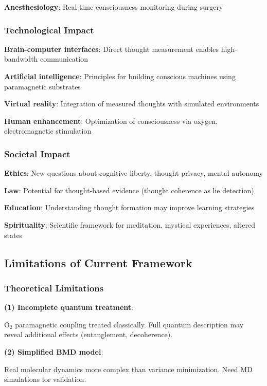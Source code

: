 \documentclass[11pt,onecolumn]{article}
\begin{document}
\textbf{Anesthesiology}: Real-time consciousness monitoring during surgery

\subsubsection{Technological Impact}

\textbf{Brain-computer interfaces}: Direct thought measurement enables high-bandwidth communication

\textbf{Artificial intelligence}: Principles for building conscious machines using paramagnetic substrates

\textbf{Virtual reality}: Integration of measured thoughts with simulated environments

\textbf{Human enhancement}: Optimization of consciousness via oxygen, electromagnetic stimulation

\subsubsection{Societal Impact}

\textbf{Ethics}: New questions about cognitive liberty, thought privacy, mental autonomy

\textbf{Law}: Potential for thought-based evidence (thought coherence as lie detection)

\textbf{Education}: Understanding thought formation may improve learning strategies

\textbf{Spirituality}: Scientific framework for meditation, mystical experiences, altered states

\subsection{Limitations of Current Framework}

\subsubsection{Theoretical Limitations}

\textbf{(1) Incomplete quantum treatment}:

O$_2$ paramagnetic coupling treated classically. Full quantum description may reveal additional effects (entanglement, decoherence).

\textbf{(2) Simplified BMD model}:

Real molecular dynamics more complex than variance minimization. Need MD simulations for validation.
\end{document}
